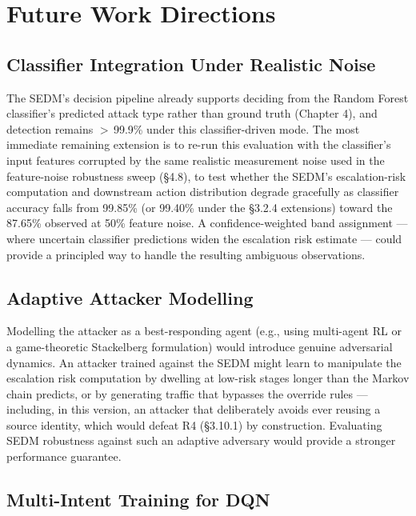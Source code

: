 \section{Future Work Directions}
\label{sec:future}

\subsection{Classifier Integration Under Realistic Noise}
\label{sec:future_classifier}

The SEDM's decision pipeline already supports deciding from the Random
Forest classifier's predicted attack type rather than ground truth
(Chapter 4), and detection remains $>$\,99.9\% under this classifier-driven
mode.
The most immediate remaining extension is to re-run this evaluation with
the classifier's input features corrupted by the same realistic
measurement noise used in the feature-noise robustness sweep (\S4.8), to
test whether the SEDM's escalation-risk computation and downstream action
distribution degrade gracefully as classifier accuracy falls from 99.85\%
(or 99.40\% under the \S3.2.4 extensions) toward the 87.65\% observed at
50\% feature noise.
A confidence-weighted band assignment --- where uncertain classifier
predictions widen the escalation risk estimate --- could provide a principled
way to handle the resulting ambiguous observations.

\subsection{Adaptive Attacker Modelling}

Modelling the attacker as a best-responding agent (e.g., using multi-agent
RL or a game-theoretic Stackelberg formulation) would introduce genuine
adversarial dynamics.
An attacker trained against the SEDM might learn to manipulate the
escalation risk computation by dwelling at low-risk stages longer than
the Markov chain predicts, or by generating traffic that bypasses the
override rules --- including, in this version, an attacker that
deliberately avoids ever reusing a source identity, which would defeat R4
(\S3.10.1) by construction.
Evaluating SEDM robustness against such an adaptive adversary would provide
a stronger performance guarantee.

\subsection{Multi-Intent Training for DQN}

